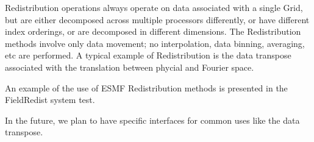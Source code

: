 

Redistribution operations always operate on data associated with a
single Grid, but are either decomposed across multiple processors
differently, or have different index orderings, or are decomposed
in different dimensions.  The Redistribution methods involve only
data movement; no interpolation, data binning, averaging, etc are
performed.  A typical example of Redistribution is the data transpose
associated with the translation between phycial and Fourier space.

An example of the use of ESMF Redistribution methods is presented in
the FieldRedist system test.

In the future, we plan to have specific interfaces for common uses
like the data transpose.
